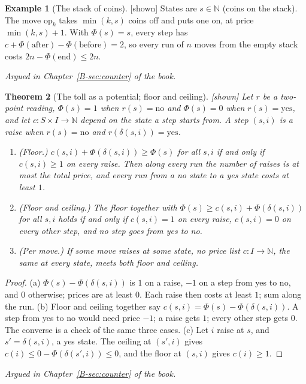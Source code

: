 \documentclass[11pt, a4paper]{article}
\theoremstyle{plain}
\newtheorem{theorem}{Theorem}[section]
\theoremstyle{definition}
\newtheorem{example}[theorem]{Example}
\theoremstyle{remark}
\newcommand{\N}{\mathbb{N}}
\newcommand{\step}{\delta}
\newcommand{\cost}{c}
\newcommand{\rd}{r}
\newcommand{\argued}[1]{\par\noindent\textit{Argued in Chapter~\ref{B-#1} of the book.}\par}
\newcommand{\kind}[1]{\textup{[#1]}}
\begin{document}
\begin{example}[The stack of coins]\label{spec:stack} \kind{shown}
States are $s\in\N$ (coins on the stack). The move $\mathrm{op}_k$ takes $\min(k,s)$ coins off and puts one
on, at price $\min(k,s)+1$. With $\Phi(s)=s$, every step has $\cost+\Phi(\text{after})-\Phi(\text{before})=2$,
so every run of $n$ moves from the empty stack costs $2n-\Phi(\text{end})\le 2n$.
\end{example}
\argued{sec:counter}

\begin{theorem}[The toll as a potential; floor and ceiling]\label{spec:floor-ceiling} \kind{shown}
Let $\rd$ be a two-point reading, $\Phi(s)=1$ when $\rd(s)=\mathrm{no}$ and $\Phi(s)=0$ when
$\rd(s)=\mathrm{yes}$, and let $\cost:S\times I\to\N$ depend on the state a step starts from. A step $(s,i)$ is a
\emph{raise} when $\rd(s)=\mathrm{no}$ and $\rd(\step(s,i))=\mathrm{yes}$.
\begin{enumerate}[label=(\alph*)]
\item (Floor.) $\cost(s,i)+\Phi(\step(s,i))\ge\Phi(s)$ for all $s,i$ if and only if $\cost(s,i)\ge 1$ on every
raise. Then along every run the number of raises is at most the total price, and every run from a no state to
a yes state costs at least $1$.
\item (Floor and ceiling.) The floor together with $\Phi(s)\ge\cost(s,i)+\Phi(\step(s,i))$ for all $s,i$ holds if
and only if $\cost(s,i)=1$ on every raise, $\cost(s,i)=0$ on every other step, and no step goes from yes to no.
\item (Per move.) If some move raises at some state, no price list $\cost:I\to\N$, the same at every state,
meets both floor and ceiling.
\end{enumerate}
\end{theorem}
\begin{proof}
(a) $\Phi(s)-\Phi(\step(s,i))$ is $1$ on a raise, $-1$ on a step from yes to no, and $0$ otherwise; prices are
at least $0$. Each raise then costs at least $1$; sum along the run. (b) Floor and ceiling together say
$\cost(s,i)=\Phi(s)-\Phi(\step(s,i))$. A step from yes to no would need price $-1$; a raise gets $1$; every
other step gets $0$. The converse is a check of the same three cases. (c) Let $i$ raise at $s$, and
$s'=\step(s,i)$, a yes state. The ceiling at $(s',i)$ gives $\cost(i)\le 0-\Phi(\step(s',i))\le0$, and the
floor at $(s,i)$ gives $\cost(i)\ge1$.
\end{proof}
\argued{sec:counter}
\end{document}
